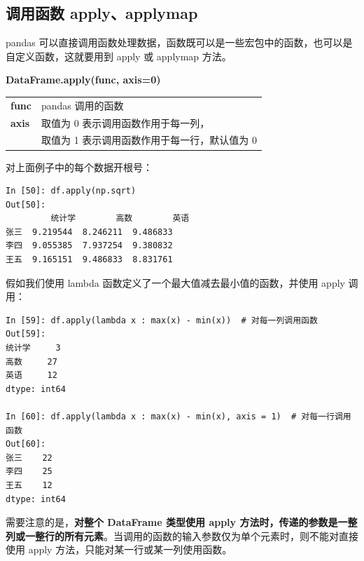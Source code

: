 \subsection{调用函数 apply、applymap}


pandas 可以直接调用函数处理数据，函数既可以是一些宏包中的函数，也可以是自定义函数，这就要用到 apply 或 applymap 方法。

\begin{center}
\begin{tcolorbox}[title = apply 的一般语法]
\textbf{DataFrame.apply(func, axis=0)}
\tcblower
\vspace{10pt}

\begin{tcboutputlisting}
\begin{tabular}{>{\bfseries}ll}
  func & pandas 调用的函数\\
axis & 取值为 0 表示调用函数作用于每一列，\\
&取值为 1 表示调用函数作用于每一行，默认值为 0\\
\end{tabular}
\end{tcboutputlisting}
\tcbuselistingtext
\end{tcolorbox}
\end{center}


对上面例子中的每个数据开根号：

\begin{lstlisting}[Language=Python]
In [50]: df.apply(np.sqrt)
Out[50]:
         统计学        高数        英语
张三  9.219544  8.246211  9.486833
李四  9.055385  7.937254  9.380832
王五  9.165151  9.486833  8.831761
\end{lstlisting}

假如我们使用 lambda 函数定义了一个最大值减去最小值的函数，并使用 apply 调用：

\begin{lstlisting}[Language=Python]
In [59]: df.apply(lambda x : max(x) - min(x))  # 对每一列调用函数
Out[59]:
统计学     3
高数     27
英语     12
dtype: int64

In [60]: df.apply(lambda x : max(x) - min(x), axis = 1)  # 对每一行调用函数
Out[60]:
张三    22
李四    25
王五    12
dtype: int64
\end{lstlisting}

需要注意的是，\textbf{对整个 DataFrame 类型使用 apply 方法时，传递的参数是一整列或一整行的所有元素}。当调用的函数的输入参数仅为单个元素时，则不能对直接使用 apply 方法，只能对某一行或某一列使用函数。

